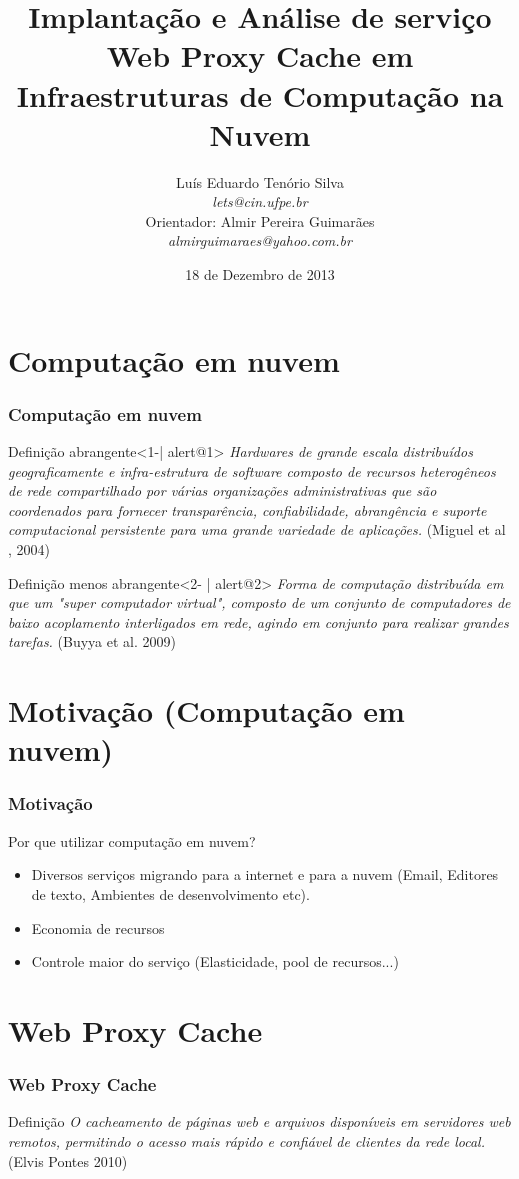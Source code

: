 \documentclass{beamer}
\title[TCC]{Implantação e Análise de serviço Web Proxy Cache em Infraestruturas de Computação na Nuvem}
\author{Luís Eduardo Tenório Silva\\\textit{lets@cin.ufpe.br}\\Orientador: Almir Pereira Guimarães\\\textit{almirguimaraes@yahoo.com.br}}
\date[18/12/13]{18 de Dezembro de 2013}
\begin{document}
    \frame{\titlepage}

    \frame{\footnotesize{\tableofcontents}}
    \section{Computação em nuvem}
    \begin{frame}
      \frametitle{Computação em nuvem}
      \begin{block}{Definição abrangente}<1-| alert@1>
      \textit{Hardwares de grande escala distribuídos geograficamente e infra-estrutura de software composto de recursos heterogêneos de rede compartilhado por várias organizações administrativas que são coordenados para fornecer transparência, confiabilidade, abrangência e suporte computacional persistente para uma grande variedade de aplicações.} (Miguel et
al , 2004)
    \end{block}    
    \begin{block}{Definição menos abrangente}<2- | alert@2>
      \textit{Forma de computação distribuída em que um "super computador virtual", composto de um conjunto de computadores de baixo
acoplamento interligados em rede, agindo em conjunto para realizar grandes tarefas.} (Buyya et al. 2009)
     \end{block}       
    \end{frame}
    \section{Motivação (Computação em nuvem)}
    \begin{frame}
      \frametitle{Motivação}
      Por que utilizar computação em nuvem?
      \begin{itemize}
       \item <2->Diversos serviços migrando para a internet e para a nuvem (Email, Editores de texto, Ambientes de desenvolvimento etc).
       \item <3->Economia de recursos
       \item <4->Controle maior do serviço (Elasticidade, pool de recursos...)
      \end{itemize}
    \end{frame}
    \section{Web Proxy Cache}
    \begin{frame}
      \frametitle{Web Proxy Cache}
      \begin{block}{Definição}
	\textit{O cacheamento de páginas web e arquivos disponíveis em servidores web remotos, permitindo o acesso mais rápido e
confiável de clientes da rede local.} (Elvis Pontes 2010)
      \end{block}
    \end{frame}
\end{document}
